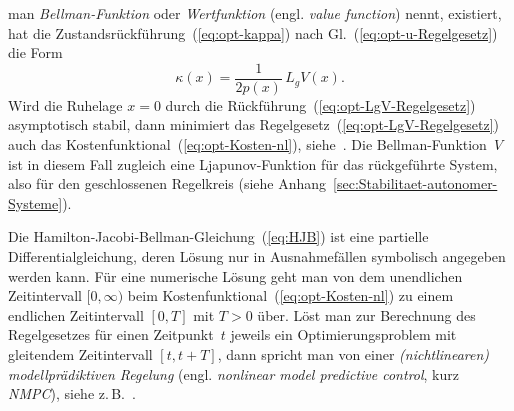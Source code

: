 man \emph{Bellman-Funktion} oder \emph{Wertfunktion}
(engl. \emph{value function}) nennt, existiert, hat die Zustandsrückführung~(\ref{eq:opt-kappa})
nach Gl.~(\ref{eq:opt-u-Regelgesetz}) die Form
\begin{equation}
\kappa(x)=\frac{1}{2p(x)}\,L_{g}V(x).\label{eq:opt-LgV-Regelgesetz}
\end{equation}
Wird die Ruhelage $x=0$ durch die Rückführung~(\ref{eq:opt-LgV-Regelgesetz})
asymptotisch stabil, dann minimiert das Regelgesetz~(\ref{eq:opt-LgV-Regelgesetz})
auch das Kostenfunktional~(\ref{eq:opt-Kosten-nl}), siehe~\cite[Theorem~{3.19}]{sepulchre97}.
Die Bellman-Funktion~$V$ ist in diesem Fall zugleich eine Ljapunov-Funktion
für das rückgeführte System, also für den geschlossenen Regelkreis
(siehe Anhang~\ref{sec:Stabilitaet-autonomer-Systeme}).

\begin{remark}
Die Hamilton-Jacobi-Bellman-Gleichung~(\ref{eq:HJB}) ist eine partielle
Differentialgleichung, deren Lösung nur in Ausnahmefällen symbolisch
angegeben werden kann. Für eine numerische Lösung geht man von dem
unendlichen Zeitintervall $[0,\infty)$ beim Kostenfunktional~(\ref{eq:opt-Kosten-nl})
zu einem endlichen Zeitintervall $[0,T]$ mit $T>0$ über. Löst man
zur Berechnung des Regelgesetzes für einen Zeitpunkt~$t$ jeweils
ein Optimierungsproblem mit gleitendem Zeitintervall $[t,t+T]$, dann
spricht man von einer \emph{(nichtlinearen) modellprädiktiven Regelung}
(engl. \emph{nonlinear model predictive control}, kurz \emph{NMPC}),
siehe z.\,B.~\cite{graichen2010nmpc,allgower2012nonlinear}.
\end{remark}

